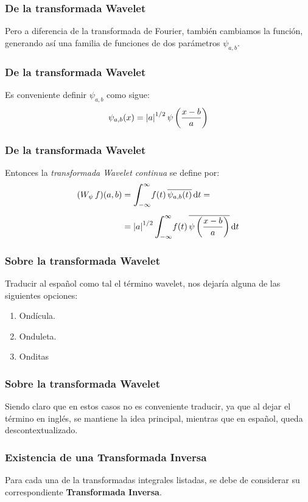 \documentclass[12pt]{beamer}
\begin{document}
\begin{frame}
\frametitle{De la transformada Wavelet}
Pero a diferencia de la transformada de Fourier, también cambiamos la función, generando así una familia de funciones de dos parámetros $\psi_{a, b}$.
\end{frame}
\begin{frame}
\frametitle{De la transformada Wavelet}
Es conveniente definir $\psi_{a, b}$ como sigue:
\pause
\begin{align*}
\psi_{a, b} (x) = \abs{a}^{1/2} \, \psi \left( \dfrac{x - b}{a} \right)
\end{align*}
\end{frame}
\begin{frame}
\frametitle{De la transformada Wavelet}
Entonces la \emph{transformada Wavelet continua} se define por:
\pause
\begin{align*}
(W_{\psi} \, f) (a, b) &= \scaleint{6ex}_{\bs -\infty}^{\infty} f (t) \, \overline{\psi_{a, b} (t)} \dd{t} = \\[0.5em]
&= \abs{a}^{1/2} \, \scaleint{6ex}_{\bs -\infty}^{\infty} f (t) \, \overline{\psi \left( \dfrac{x - b}{a} \right)} \dd{t}
\end{align*}
\end{frame}
\begin{frame}
\frametitle{Sobre la transformada Wavelet}
Traducir al español como tal el término wavelet, nos dejaría alguna de las siguientes opciones:
\begin{enumerate}[<+->]
\item Ondícula.
\item Onduleta.
\item Onditas
\end{enumerate}
\end{frame}
\begin{frame}
\frametitle{Sobre la transformada Wavelet}
Siendo claro que en estos casos no es conveniente traducir, ya que al dejar el término en inglés, se mantiene la idea principal, mientras que en español, queda descontextualizado.
\end{frame}
\begin{frame}
\frametitle{Existencia de una Transformada Inversa}
Para cada una de la transformadas integrales listadas, se debe de considerar su correspondiente \textbf{\textcolor{carnelian}{Transformada Inversa}}.
\end{frame}
\end{document}
